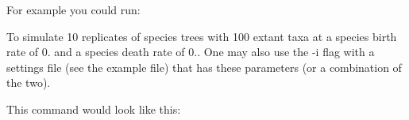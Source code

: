 For example you could run\+: 
\begin{DoxyCode}{0}
\end{DoxyCode}
 To simulate 10 replicates of species trees with 100 extant taxa at a species birth rate of 0. and a species death rate of 0.. One may also use the {\ttfamily -\/i} flag with a settings file (see the example file) that has these parameters (or a combination of the two).

This command would look like this\+: 
\begin{DoxyCode}{0}
\end{DoxyCode}
 